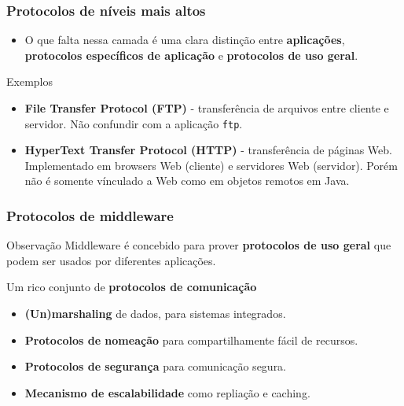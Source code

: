 \documentclass[xcolor=dvipsnames,10pt,compress,aspectratio=169]{beamer}
\begin{document}
\begin{frame}
  \frametitle{Protocolos de níveis mais altos}
  \begin{itemize}
  \item O que falta nessa camada é uma clara distinção entre \textbf{aplicações}, \textbf{protocolos 
    específicos de aplicação} e \textbf{protocolos de uso geral}.
  \end{itemize}
  \begin{exampleblock}{Exemplos}
    \begin{itemize}
    \item \textbf{File Transfer Protocol (FTP)} - transferência de arquivos entre cliente e servidor. Não confundir
      com a aplicação \texttt{ftp}.
    \item \textbf{HyperText Transfer Protocol (HTTP)} - transferência de páginas Web. Implementado em 
      browsers Web (cliente) e servidores Web (servidor). Porém não é somente vínculado a Web como em objetos
      remotos em Java.
    \end{itemize}
  \end{exampleblock}
\end{frame}

\begin{frame}
  \frametitle{Protocolos de middleware}
  \begin{block}{Observação}
  Middleware é concebido para prover \textbf{protocolos de uso geral} que podem ser usados por 
  diferentes aplicações.
  \end{block}
  \begin{exampleblock}{Um rico conjunto de \textbf{protocolos de comunicação}}
    \begin{itemize}
    \item \textbf{(Un)marshaling} de dados, para sistemas integrados.
    \item \textbf{Protocolos de nomeação} para compartilhamente fácil de recursos.
    \item \textbf{Protocolos de segurança} para comunicação segura.
    \item \textbf{Mecanismo de escalabilidade} como repliação e caching.
    \end{itemize}
  \end{exampleblock}
\end{frame}
\end{document}
